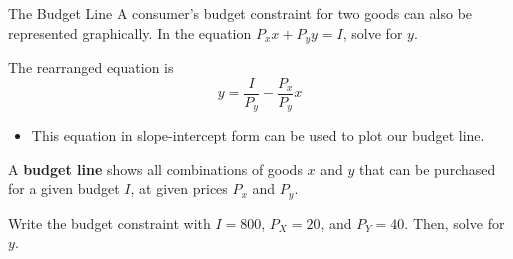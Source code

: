 \documentclass[11pt,t]{beamer}
\begin{document}
\begin{frame}{The Budget Line}
  A consumer's budget constraint for two goods can also be represented graphically. In the equation $P_x x + P_y y = I$, solve for $y$.
  
  \pause\bigskip
  The rearranged equation is 
  $$
    y = \frac{I}{P_y} - \frac{P_x}{P_y}x
  $$
  
  \begin{itemize}
    \item This equation in slope-intercept form can be used to plot our budget line.
  \end{itemize}

  \bigskip
  A \textbf{budget line} shows all combinations of goods $x$ and $y$ that can be purchased for a given budget $I$, at given prices $P_x$ and $P_y$.
\end{frame}

\begin{frame}

  \bigskip
  Write the budget constraint with $I = 800$, $P_X = 20$, and $P_Y = 40$. Then, solve for $y$.
\end{frame}
\end{document}

